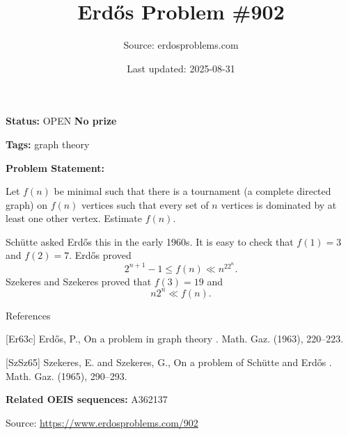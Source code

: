 \documentclass{article}
\title{Erd\H{o}s Problem \#902}
\date{Last updated: 2025-08-31}
\author{Source: erdosproblems.com}
\begin{document}
\maketitle

\noindent\textbf{Status:} OPEN \quad \textbf{No prize}

\noindent\textbf{Tags:} graph theory

\medskip

\noindent\textbf{Problem Statement:}

Let $f(n)$ be minimal such that there is a tournament (a complete directed graph) on $f(n)$ vertices such that every set of $n$ vertices is dominated by at least one other vertex. Estimate $f(n)$.




Sch\"{u}tte asked Erd\H{o}s this in the early 1960s. It is easy to check that $f(1)=3$ and $f(2)=7$. Erd\H{o}s \cite{Er63c} proved\[2^{n+1}-1 \leq f(n) \ll n^22^n.\]Szekeres and Szekeres \cite{SzSz65} proved that $f(3)=19$ and\[n2^n \ll f(n).\]




References

[Er63c] Erd\H{o}s, P., On a problem in graph theory . Math. Gaz. (1963), 220--223.

[SzSz65] Szekeres, E. and Szekeres, G., On a problem of Sch\"{u}tte and {E}rd\H{o}s . Math. Gaz. (1965), 290--293.

\noindent\textbf{Related OEIS sequences:} A362137


\bigskip
\noindent\small{Source: \url{https://www.erdosproblems.com/902}}
\end{document}
